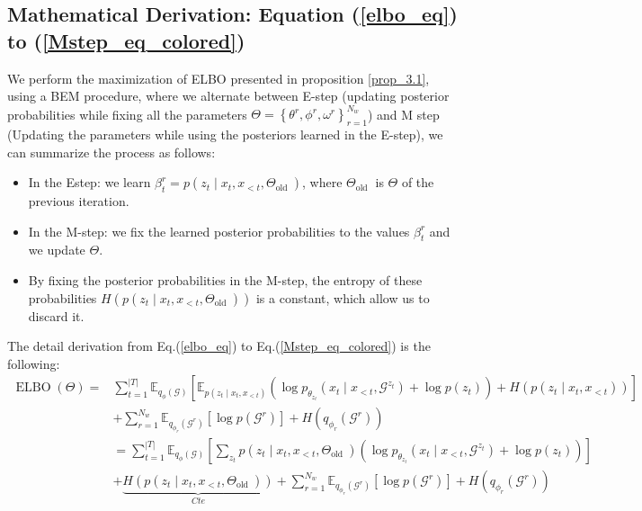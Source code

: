 \subsection{Mathematical Derivation: Equation (\ref{elbo_eq}) to (\ref{Mstep_eq_colored})}
We perform the maximization of ELBO presented in proposition \ref{prop_3.1}, using a BEM procedure, where we alternate between E-step (updating posterior probabilities while fixing all the parameters $\Theta=\left\{\theta^r, \phi^r, \omega^r\right\}_{r=1}^{N_w}$) and M step (Updating the parameters while using the posteriors learned in the E-step), we can summarize the process as follows:
\begin{itemize}
    \item In the Estep: we learn $\beta_t^r=p\left(z_t \mid x_t, x_{<t}, \Theta_{\text {old }}\right)$, where $\Theta_{\text {old }}$ is $\Theta$ of the previous iteration.
    \item In the M-step: we fix the learned posterior probabilities to the values $\beta_t^r$ and we update $\Theta$.
    \item By fixing the posterior probabilities in the M-step, the entropy of these probabilities $H\left(p\left(z_t \mid x_t, x_{<t}, \Theta_{\text {old }}\right)\right)$ is a constant, which allow us to discard it.
\end{itemize}
The detail derivation from Eq.(\ref{elbo_eq}) to Eq.(\ref{Mstep_eq_colored}) is the following:
\begin{equation}
\begin{aligned}
 \operatorname{ELBO}(\Theta)=&\sum_{t=1}^{|T|} \mathbb{E}_{q_\phi(\mathcal{G})}\left[\mathbb{E}_{p\left(z_t \mid x_t, x_{<t}\right)}\left(\log p_{\theta_{z_t}}\left(x_t \mid x_{<t}, \mathcal{G}^{z_t}\right)+\log p\left(z_t\right)\right)+H\left(p\left(z_t \mid x_t, x_{<t}\right)\right)\right]\\
 &+\sum_{r=1}^{N_w} \mathbb{E}_{q_{\phi_r}\left(\mathcal{G}^r\right)}\left[\log p\left(\mathcal{G}^r\right)\right]+H\left(q_{\phi_r}\left(\mathcal{G}^r\right)\right) \\
& =\sum_{t=1}^{|T|} \mathbb{E}_{q_\phi(\mathcal{G})}\left[\sum_{z_t} p\left(z_t \mid x_t, x_{<t}, \Theta_{\text {old }}\right)\left(\log p_{\theta_{z_t}}\left(x_t \mid x_{<t}, \mathcal{G}^{z_t}\right)+\log p\left(z_t\right)\right)\right]\\
&+\underbrace{H\left(p\left(z_t \mid x_t, x_{<t}, \Theta_{\text {old }}\right)\right)}_{Cte}+\sum_{r=1}^{N_w} \mathbb{E}_{q_{\phi_r}\left(\mathcal{G}^r\right)}\left[\log p\left(\mathcal{G}^r\right)\right]+H\left(q_{\phi_r}\left(\mathcal{G}^r\right)\right)
\end{aligned}
\end{equation}

